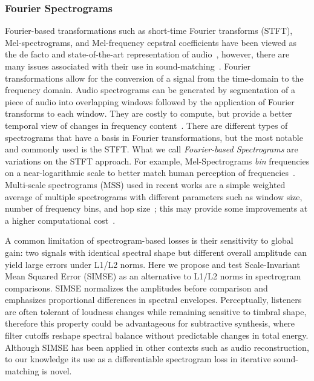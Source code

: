 \subsubsection{Fourier Spectrograms}
\label{sec:fourier_specs}
Fourier-based transformations such as short-time Fourier transforms (\gls{STFT}), Mel-spectrograms, and Mel-frequency cepstral coefficients have been viewed as the de facto and state-of-the-art representation of audio~\cite{beauchamp2003error,mitchell2007evolutionary,yee2018automatic}, however, there are many issues associated with their use in sound-matching~\cite{turian2020sorry,vahidi2023mesostructures,han2023perceptual,uzrad2024diffmoog}. Fourier transformations allow for the conversion of a signal from the time-domain to the frequency domain. Audio spectrograms can be generated by segmentation of a piece of audio into overlapping windows followed by the application of Fourier transforms to each window. They are costly to compute, but provide a better temporal view of changes in frequency content~\cite{muller2007dynamic,smith2007mathematics}. There are different types of spectrograms that have a basis in Fourier transformations, but the most notable and commonly used is the STFT.  
What we call \textit{Fourier-based Spectrograms} are variations on the STFT approach. For example, Mel-Spectrograms \textit{bin} frequencies on a near-logarithmic scale to better match human perception of frequencies~\cite{muller2007dynamic}. Multi-scale spectrograms (\gls{MSS}) used in recent works are a simple weighted average of multiple spectrograms with different parameters such as window size, number of frequency bins, and hop size~\cite{engel2020ddsp,vahidi2023mesostructures}; this may provide some improvements at a higher computational cost~\cite{turian2020sorry,engel2020ddsp}.

A common limitation of spectrogram-based losses is their sensitivity to global gain: two signals with identical spectral shape but different overall amplitude can yield large errors under L1/L2 norms. 
Here we propose and test Scale-Invariant Mean Squared Error (SIMSE) as an alternative to L1/L2 norms in spectrogram comparisons. SIMSE normalizes the amplitudes before comparison and emphasizes proportional differences in spectral envelopes. 
Perceptually, listeners are often tolerant of loudness changes while remaining sensitive to timbral shape, therefore this property could be advantageous for subtractive synthesis, where filter cutoffs reshape spectral balance without predictable changes in total energy. Although SIMSE has been applied in other contexts such as audio reconstruction, to our knowledge its use as a differentiable spectrogram loss in iterative sound-matching is novel.


